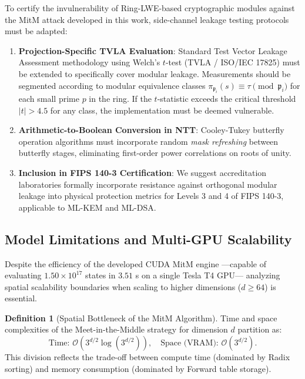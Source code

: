\documentclass[11pt,a4paper]{article}
\theoremstyle{plain}
\theoremstyle{definition}
\newtheorem{definicion}[teorema]{Definition}
\numberwithin{equation}{section}
\newcommand{\cO}{\mathcal{O}}
\newcommand{\fkp}{\mathfrak{p}}
\begin{document}
To certify the invulnerability of Ring-LWE-based cryptographic modules against the MitM attack developed in this work, side-channel leakage testing protocols must be adapted:

\begin{enumerate}
    \item \textbf{Projection-Specific TVLA Evaluation}: Standard Test Vector Leakage Assessment methodology using Welch's $t$-test (TVLA / ISO/IEC 17825) must be extended to specifically cover modular leakage. Measurements should be segmented according to modular equivalence classes $\pi_{\fkp_i}(s) \equiv \tau \pmod{\fkp_i}$ for each small prime $p$ in the ring. If the $t$-statistic exceeds the critical threshold $|t| > 4.5$ for any class, the implementation must be deemed vulnerable.
    \item \textbf{Arithmetic-to-Boolean Conversion in NTT}: Cooley-Tukey butterfly operation algorithms must incorporate random \emph{mask refreshing} between butterfly stages, eliminating first-order power correlations on roots of unity.
    \item \textbf{Inclusion in FIPS 140-3 Certification}: We suggest accreditation laboratories formally incorporate resistance against orthogonal modular leakage into physical protection metrics for Levels 3 and 4 of FIPS 140-3, applicable to ML-KEM and ML-DSA.
\end{enumerate}

\subsection{Model Limitations and Multi-GPU Scalability}
\label{subsec:escalabilidad}

Despite the efficiency of the developed CUDA MitM engine —capable of evaluating $1.50 \times 10^{17}$ states in $3.51$ s on a single Tesla T4 GPU— analyzing spatial scalability boundaries when scaling to higher dimensions ($d \ge 64$) is essential.

\begin{definicion}[Spatial Bottleneck of the MitM Algorithm]
\label{def:cuello_botella_mitm}
Time and space complexities of the Meet-in-the-Middle strategy for dimension $d$ partition as:
\begin{equation}
\text{Time: } \cO\left(3^{d/2} \log(3^{d/2})\right), \quad \text{Space (VRAM): } \cO\left(3^{d/2}\right).
\end{equation}
This division reflects the trade-off between compute time (dominated by Radix sorting) and memory consumption (dominated by Forward table storage).
\end{definicion}
\end{document}
